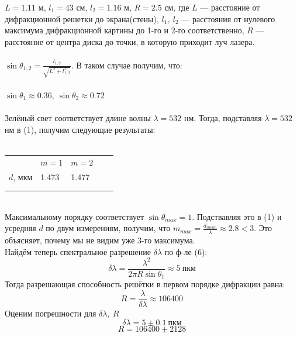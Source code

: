 \documentclass[a4paper]{article}
\begin{document}
$L=1.11$ м, $l_1=43$ см, $l_2=1.16$ м, $R=2.5$ см, где $L$ --- расстояние от дифракционной решетки до экрана(стены),
$l_1,~l_2$ --- расстояния от нулевого максимума дифракционной картины до 1-го и 2-го соответственно, $R$ --- расстояние
от центра диска до точки, в которую приходит луч лазера.\\
\\
$\sin\theta_{1,2}=\displaystyle\frac{l_{1,2}}{\sqrt{L^2+l_{1,2}^2}}$. В таком случае получим, что:\\
\\
$\sin\theta_1\approx0.36,~\sin\theta_2\approx0.72$\\\
\\
Зелёный свет соответствует длине волны $\lambda=532$ нм. Тогда, подставляя $\lambda=532$ нм в (1), получим следующие результаты:
\\
\\
\begin{tabular}{lllll}
\cline{1-3}
\multicolumn{1}{|l|}{}  & \multicolumn{1}{l|}{$m=1$}   & \multicolumn{1}{l|}{$m=2$}   &  &  \\ \cline{1-3}
\multicolumn{1}{|l|}{$d$, мкм} & \multicolumn{1}{l|}{1.473} & \multicolumn{1}{l|}{1.477} &  &  \\ \cline{1-3}
                        &                            &                            &  &  \\
                        &                            &                            &  &
\end{tabular}
\\
Максимальному порядку соответствует $\sin\theta_{max}=1$. Подствавляя это в (1) и усредняя $d$ по двум измерениям,
получим, что $m_{max}=\displaystyle\frac{d_{mean}}{\lambda}\approx2.8<3$. Это объясняет,
почему мы не видим уже 3-го максимума.\\
Найдём теперь  спектральное разрешение $\delta\lambda$ по ф-ле (6):
\begin{equation}\label{eq7}
\delta\lambda=\displaystyle\frac{\lambda^2}{2\pi R\sin\theta_1}\approx5~пкм
\end{equation}
Тогда разрешающая способность решётки в первом порядке дифракции равна:
\begin{equation}\label{eq8}
R=\displaystyle\frac{\lambda}{\delta\lambda}\approx106400
\end{equation}
Оценим погрешности для $\delta\lambda,~R$
    $$ \delta\lambda=5\pm 0.1~пкм$$
    $$ R=106400\pm2128 $$
\end{document}
